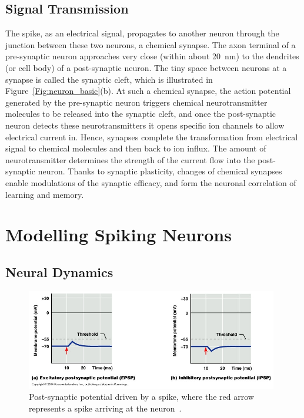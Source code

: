 \subsection{Signal Transmission}
\label{subsec:spike_trans}
The spike, as an electrical signal, propagates to another neuron through the junction between these two neurons, a chemical synapse.
The axon terminal of a pre-synaptic neuron approaches very close (within about 20~nm) to the dendrites (or cell body) of a  post-synaptic neuron.
The tiny space between neurons at a synapse is called the synaptic cleft, which is illustrated in Figure~\ref{Fig:neuron_basic}(b).
At such a chemical synapse, the action potential generated by the pre-synaptic neuron triggers chemical neurotransmitter molecules to be released into the synaptic cleft, and once the post-synaptic neuron detects these neurotransmitters it opens specific ion channels to allow electrical current in.
Hence, synapses complete the transformation from electrical signal to chemical molecules and then back to ion influx.
The amount of neurotransmitter determines the strength of the current flow into the post-synaptic neuron.
Thanks to synaptic plasticity, changes of chemical synapses enable modulations of the synaptic efficacy, and form the neuronal correlation of learning and memory.

\section{Modelling Spiking Neurons}
\label{sec:spike}

\subsection{Neural Dynamics}

\begin{figure}[tb!]
	\centering
	\includegraphics[width=0.98\textwidth]{pics_snn/EI_PSP.JPG}
	\caption{Post-synaptic potential driven by a spike, where the red arrow represents a spike arriving at the neuron~\citep{marieb2007human}.}
	\label{Fig:psp}
\end{figure}

